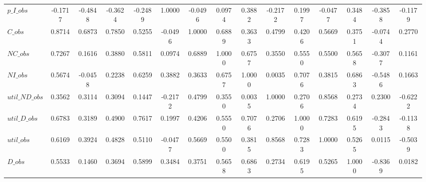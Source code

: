 \begin{center}
\begin{longtable}{lcccccccccccccc}
$p\_I\_obs      $	 & 	          -0.1717	 & 	          -0.4848	 & 	          -0.3624	 & 	          -0.2489	 & 	           1.0000	 & 	          -0.0496	 & 	           0.0974	 & 	           0.3882	 & 	          -0.2172	 & 	           0.1997	 & 	          -0.0477	 & 	           0.3484	 & 	          -0.3858	 & 	          -0.1179 \\ 
$C\_obs         $	 & 	           0.8714	 & 	           0.6873	 & 	           0.7850	 & 	           0.5255	 & 	          -0.0496	 & 	           1.0000	 & 	           0.6889	 & 	           0.3633	 & 	           0.4799	 & 	           0.4206	 & 	           0.5669	 & 	           0.3751	 & 	          -0.0744	 & 	           0.2770 \\ 
$NC\_obs        $	 & 	           0.7267	 & 	           0.1616	 & 	           0.3880	 & 	           0.5811	 & 	           0.0974	 & 	           0.6889	 & 	           1.0000	 & 	           0.6757	 & 	           0.3550	 & 	           0.5550	 & 	           0.5500	 & 	           0.5658	 & 	          -0.3077	 & 	           0.1161 \\ 
$NI\_obs        $	 & 	           0.5674	 & 	          -0.0458	 & 	           0.2238	 & 	           0.6259	 & 	           0.3882	 & 	           0.3633	 & 	           0.6757	 & 	           1.0000	 & 	           0.0035	 & 	           0.7076	 & 	           0.3815	 & 	           0.6863	 & 	          -0.5486	 & 	           0.1663 \\ 
$util\_ND\_obs  $	 & 	           0.3562	 & 	           0.3114	 & 	           0.3094	 & 	           0.1447	 & 	          -0.2172	 & 	           0.4799	 & 	           0.3550	 & 	           0.0035	 & 	           1.0000	 & 	           0.2706	 & 	           0.8568	 & 	           0.2734	 & 	           0.2300	 & 	          -0.6222 \\ 
$util\_D\_obs   $	 & 	           0.6783	 & 	           0.3189	 & 	           0.4900	 & 	           0.7617	 & 	           0.1997	 & 	           0.4206	 & 	           0.5550	 & 	           0.7076	 & 	           0.2706	 & 	           1.0000	 & 	           0.7283	 & 	           0.6195	 & 	          -0.2843	 & 	          -0.1138 \\ 
$util\_obs      $	 & 	           0.6169	 & 	           0.3924	 & 	           0.4828	 & 	           0.5110	 & 	          -0.0477	 & 	           0.5669	 & 	           0.5500	 & 	           0.3815	 & 	           0.8568	 & 	           0.7283	 & 	           1.0000	 & 	           0.5265	 & 	           0.0115	 & 	          -0.5039 \\ 
$D\_obs         $	 & 	           0.5533	 & 	           0.1460	 & 	           0.3694	 & 	           0.5899	 & 	           0.3484	 & 	           0.3751	 & 	           0.5658	 & 	           0.6863	 & 	           0.2734	 & 	           0.6195	 & 	           0.5265	 & 	           1.0000	 & 	          -0.8369	 & 	           0.0182 \\ 

\end{longtable}
\end{center}
